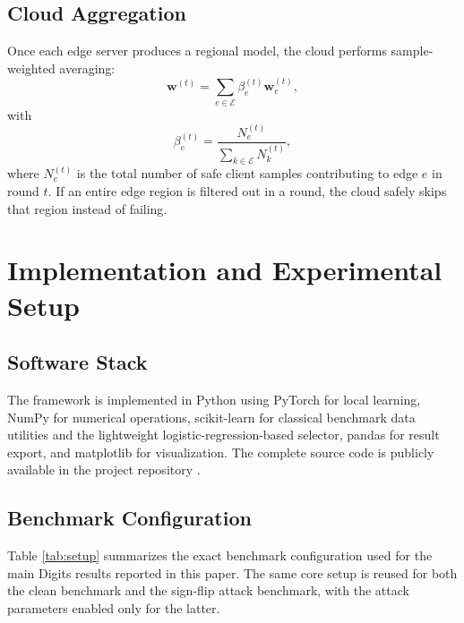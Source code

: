 \documentclass[conference]{IEEEtran}
\begin{document}
\subsection{Cloud Aggregation}
Once each edge server produces a regional model, the cloud performs sample-weighted averaging:
\begin{equation}
\mathbf{w}^{(t)} = \sum_{e \in \mathcal{E}} \beta_e^{(t)} \mathbf{w}_e^{(t)},
\end{equation}
with
\begin{equation}
\beta_e^{(t)} = \frac{N_e^{(t)}}{\sum_{k \in \mathcal{E}} N_k^{(t)}},
\end{equation}
where $N_e^{(t)}$ is the total number of safe client samples contributing to edge $e$ in round $t$. If an entire edge region is filtered out in a round, the cloud safely skips that region instead of failing.

\section{Implementation and Experimental Setup}
\subsection{Software Stack}
The framework is implemented in Python using PyTorch for local learning, NumPy for numerical operations, scikit-learn for classical benchmark data utilities and the lightweight logistic-regression-based selector, pandas for result export, and matplotlib for visualization. The complete source code is publicly available in the project repository \cite{darshit2026repo}.

\subsection{Benchmark Configuration}
Table \ref{tab:setup} summarizes the exact benchmark configuration used for the main Digits results reported in this paper. The same core setup is reused for both the clean benchmark and the sign-flip attack benchmark, with the attack parameters enabled only for the latter.
\end{document}
